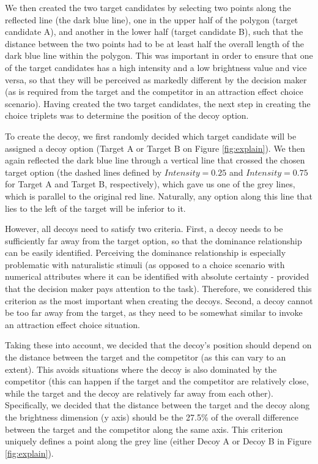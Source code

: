 \documentclass[11pt,a4paper]{article}
\begin{document}
 We then created the two target candidates by selecting two points along the reflected line (the dark blue line), one in the upper half of the polygon (target candidate A), and another in the lower half (target candidate B), such that the distance between the two points had to be at least half the overall length of the dark blue line within the polygon. This was important in order to ensure that one of the target candidates has a high intensity and a low brightness value and vice versa, so that they will be perceived as markedly different by the decision maker (as is required from the target and the competitor in an attraction effect choice scenario). Having created the two target candidates, the next step in creating the choice triplets was to determine the position of the decoy option. 

To create the decoy, we first randomly decided which target candidate will be assigned a decoy option (Target A or Target B on Figure \ref{fig:explain}). We then again reflected the dark blue line through a vertical line that crossed the chosen target option (the dashed lines defined by $Intensity = 0.25$ and $Intensity = 0.75$ for Target A and Target B, respectively), which gave us one of the grey lines, which is parallel to the original red line. Naturally, any option along this line that lies to the left of the target will be inferior to it. 

However, all decoys need to satisfy two criteria. First, a decoy needs to be sufficiently far away from the target option, so that the dominance relationship can be easily identified. Perceiving the dominance relationship is especially problematic with naturalistic stimuli (as opposed to a choice scenario with numerical attributes where it can be identified with absolute certainty - provided that the decision maker pays attention to the task). Therefore, we considered this criterion as the most important when creating the decoys. Second, a decoy cannot be too far away from the target, as they need to be somewhat similar to invoke an attraction effect choice situation.

Taking these into account, we decided that the decoy's position should depend on the distance between the target and the competitor (as this can vary to an extent). This avoids situations where the decoy is also dominated by the competitor (this can happen if the target and the competitor are relatively close, while the target and the decoy are relatively far away from each other). Specifically, we decided that the distance between the target and the decoy along the brightness dimension (y axis) should be the 27.5\% of the overall difference between the target and the competitor along the same axis. This criterion uniquely defines a point along the grey line (either Decoy A or Decoy B in Figure \ref{fig:explain}).
\end{document}
